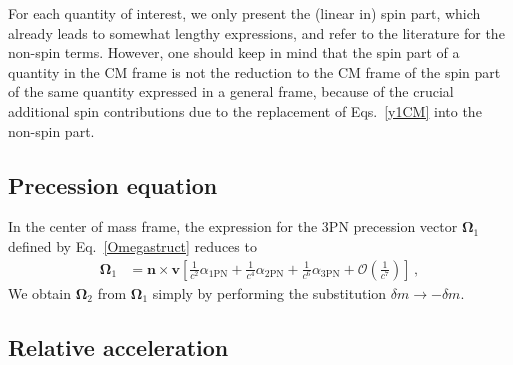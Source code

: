 \documentclass[
superscriptaddress,
preprint,
prd,tightenlines,showpacs,nofootinbib,
eqsecnum,
amsfonts,amsmath,amssymb]{revtex4-1}
\begin{document}
For each quantity of interest, we only present the (linear in) spin
part, which already leads to somewhat lengthy expressions, and refer to
the literature for the non-spin terms. However, one should keep in
mind that the spin part of a quantity in the CM frame is not the
reduction to the CM frame of the spin part of the same quantity
expressed in a general frame,
because of the crucial additional spin contributions due to the
replacement of Eqs.~\eqref{y1CM} into the non-spin part.
%

%

\subsection{Precession equation}
\label{preceq}

In the center of mass frame, the expression for the 3PN precession
vector $\mathbf{\Omega}_1$ defined by Eq.~\eqref{Omegastruct} reduces to
%
\begin{subequations}
\begin{align}
\label{OmegaCMstruct}
\mathbf{\Omega}_1 &=\mathbf{ n \times v } \left[
\frac{1}{c^2}\alpha_\mathrm{1PN}
+\frac{1}{c^4}\alpha_\mathrm{2PN}
+\frac{1}{c^6}\alpha_\mathrm{3PN}
+ \mathcal{O}\left(\frac{1}{c^7}\right)\right] \,,
\end{align}
%

\end{subequations}
We obtain $\mathbf{\Omega}_2$ from $\mathbf{\Omega}_1$ simply by
performing the substitution $\delta m \rightarrow - \delta m$.

\subsection{Relative acceleration}
\label{relacc}
\end{document}
